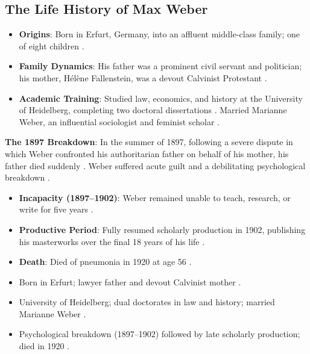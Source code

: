 \subsection{The Life History of Max Weber}

\begin{itemize}
    \item \textbf{Origins}: Born in Erfurt, Germany, into an affluent middle-class family; one of eight children .
    \item \textbf{Family Dynamics}: His father was a prominent civil servant and politician; his mother, H\'el\`ene Fallenstein, was a devout Calvinist Protestant .
    \item \textbf{Academic Training}: Studied law, economics, and history at the University of Heidelberg, completing two doctoral dissertations . Married Marianne Weber, an influential sociologist and feminist scholar .
\end{itemize}

\begin{ExampleBox}
\textbf{The 1897 Breakdown}: In the summer of 1897, following a severe dispute in which Weber confronted his authoritarian father on behalf of his mother, his father died suddenly . Weber suffered acute guilt and a debilitating psychological breakdown .
\end{ExampleBox}

\begin{DataFact}
\begin{itemize}
    \item \textbf{Incapacity (1897--1902)}: Weber remained unable to teach, research, or write for five years .
    \item \textbf{Productive Period}: Fully resumed scholarly production in 1902, publishing his masterworks over the final 18 years of his life .
    \item \textbf{Death}: Died of pneumonia in 1920 at age 56 .
\end{itemize}
\end{DataFact}

\begin{QuickRevision}
\begin{itemize}
    \item Born in Erfurt; lawyer father and devout Calvinist mother .
    \item University of Heidelberg; dual doctorates in law and history; married Marianne Weber .
    \item Psychological breakdown (1897--1902) followed by late scholarly production; died in 1920 .
\end{itemize}
\end{QuickRevision}

